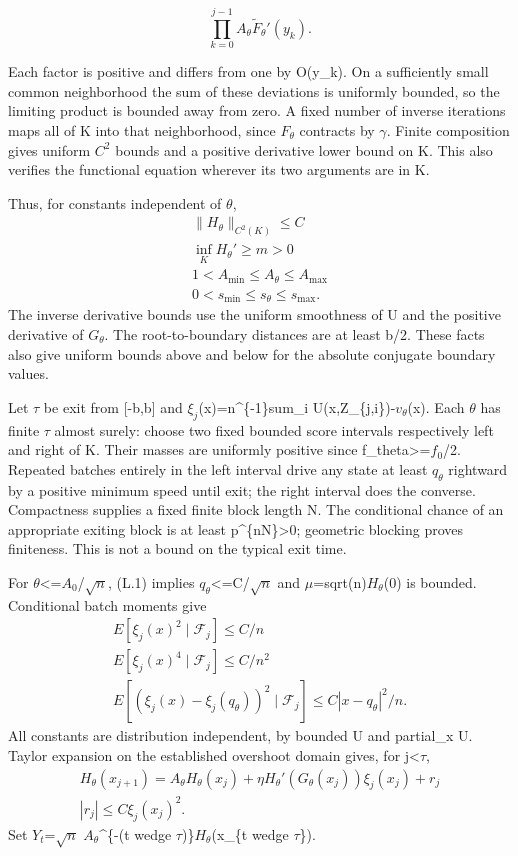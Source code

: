 \[
\prod_{k=0}^{j-1} A_\theta\widetilde F_\theta'(y_k).
\]

Each factor is positive and differs from one by O(\textbar y\_k\textbar). On a sufficiently small common neighborhood the sum of these deviations is uniformly bounded, so the limiting product is bounded away from zero. A fixed number of inverse iterations maps all of K into that neighborhood, since \(F_\theta\) contracts by \(\gamma\). Finite composition gives uniform \(C^2\) bounds and a positive derivative lower bound on K. This also verifies the functional equation wherever its two arguments are in K.

Thus, for constants independent of \(\theta\),
\[
\begin{gathered}
\|H_\theta\|_{C^2(K)}\le C \\
\inf_K H_\theta'\ge m>0 \\
1<A_{\min}\le A_\theta\le A_{\max} \\
0<s_{\min}\le s_\theta\le s_{\max}.
\tag{L.3}
\end{gathered}
\]
The inverse derivative bounds use the uniform smoothness of U and the positive derivative of \(G_\theta\). The root-to-boundary distances are at least b/2. These facts also give uniform bounds above and below for the absolute conjugate boundary values.

Let \(\tau\) be exit from {[}-b,b{]} and \(\xi_j\)(x)=n\^{}\{-1\}sum\_i U(x,Z\_\{j,i\})-\(v_\theta\)(x). Each \(\theta\) has finite \(\tau\) almost surely: choose two fixed bounded score intervals respectively left and right of K. Their masses are uniformly positive since f\_theta\textgreater=\(f_0\)/2. Repeated batches entirely in the left interval drive any state at least \(q_\theta\) rightward by a positive minimum speed until exit; the right interval does the converse. Compactness supplies a fixed finite block length N. The conditional chance of an appropriate exiting block is at least p\^{}\{nN\}\textgreater0; geometric blocking proves finiteness. This is not a bound on the typical exit time.

For \textbar{}\(\theta\)\textbar\textless=\(A_0\)/\(\sqrt n\), (L.1) implies \textbar{}\(q_\theta\)\textbar\textless=C/\(\sqrt n\) and \(\mu\)=sqrt(n)\(H_\theta\)(0) is bounded. Conditional batch moments give
\[
\begin{gathered}
E[\xi_j(x)^2\mid\mathcal F_j]\le C/n \\
E[\xi_j(x)^4\mid\mathcal F_j]\le C/n^2 \\
E[(\xi_j(x)-\xi_j(q_\theta))^2\mid\mathcal F_j]
\le C|x-q_\theta|^2/n.
\end{gathered}
\]
All constants are distribution independent, by bounded U and partial\_x U. Taylor expansion on the established overshoot domain gives, for j\textless{}\(\tau\),
\[
\begin{gathered}
H_\theta(x_{j+1})=A_\theta H_\theta(x_j)
 +\eta H_\theta'(G_\theta(x_j))\xi_j(x_j)+r_j \\
|r_j|\le C\xi_j(x_j)^2.
\end{gathered}
\]
Set \(Y_t\)=\(\sqrt n\) \(A_\theta\)\^{}\{-(t wedge \(\tau\))\}\(H_\theta\)(x\_\{t wedge \(\tau\)\}).

